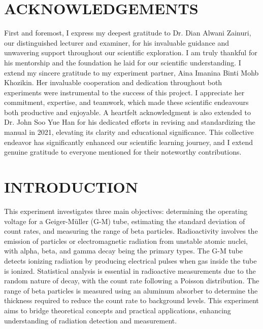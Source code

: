 \documentclass[a4paper,11pt]{article}
\begin{document}
\newpage 
{}
\section*{\large \center ACKNOWLEDGEMENTS}
\label{sec:ACKNOWLEDGEMENTS}
First and foremost, I express my deepest gratitude to Dr. Dian Alwani Zainuri, our distinguished lecturer and examiner, for his invaluable guidance and unwavering support throughout our scientific exploration. I am truly thankful for his mentorship and the foundation he laid for our scientific understanding. I extend my sincere gratitude to my experiment partner, Aina Imanina Binti Mohb Khozikin. Her invaluable cooperation and dedication throughout both experiments were instrumental to the success of this project. I appreciate her commitment, expertise, and teamwork, which made these scientific endeavours both productive and enjoyable. A heartfelt acknowledgment is also extended to Dr. John Soo Yue Han for his dedicated efforts in revising and standardizing the manual in 2021, elevating its clarity and educational significance. This collective endeavor has significantly enhanced our scientific learning journey, and I extend genuine gratitude to everyone mentioned for their noteworthy contributions.

\newpage
\renewcommand{\contentsname}{\centering CONTENTS}
\renewcommand{\cftsecleader}{\cftdotfill{\cftdotsep}} %
\renewcommand{\cftdotsep}{1.0} %
\tableofcontents
{}
{}
\label{sec:CONTENTS}

\newpage
{}
{}
\label{sec:LIST OF TABLES}
\listoftables

\newpage
{}
{}
\label{sec:LIST OF FIGURES}
\listoffigures

\newpage
{}
\section*{\center INTRODUCTION}
\label{sec:INTRODUCTION}
This experiment investigates three main objectives: determining the operating voltage for a Geiger-Müller (G-M) tube, estimating the standard deviation of count rates, and measuring the range of beta particles. Radioactivity involves the emission of particles or electromagnetic radiation from unstable atomic nuclei, with alpha, beta, and gamma decay being the primary types. The G-M tube detects ionizing radiation by producing electrical pulses when gas inside the tube is ionized. Statistical analysis is essential in radioactive measurements due to the random nature of decay, with the count rate following a Poisson distribution. The range of beta particles is measured using an aluminum absorber to determine the thickness required to reduce the count rate to background levels. This experiment aims to bridge theoretical concepts and practical applications, enhancing understanding of radiation detection and measurement.
\end{document}
